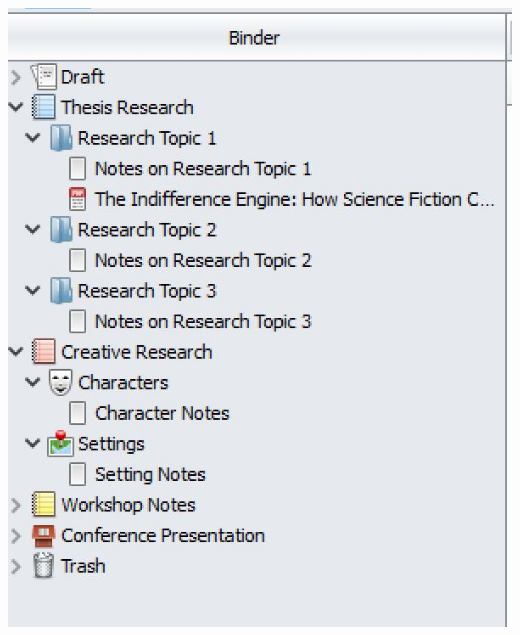 \documentclass[unknownkeysallowed,usepdftitle=false, aspectratio=169,parskip=full]{beamer}
\newcommand{\secvariable}{nothing}
\newcommand{\mysection}[1]{\renewcommand{\secvariable}{#1}
}
\begin{document}
\mysection{slab}
\begin{frame}\label{\secvariable}

\begin{center}
\includegraphics[width=1\textwidth,height=0.5\textheight,keepaspectratio]{Images/OtherUsesScriv1.JPG}
\hspace{20pt}

\end{center}
\end{frame}
\end{document}
